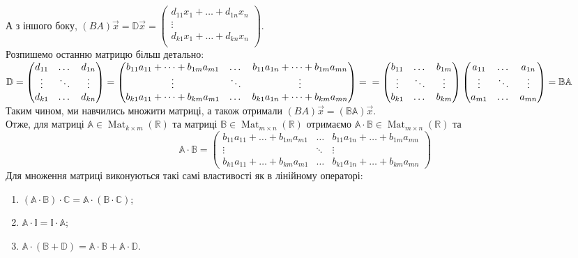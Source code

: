 \documentclass[a4paper, 10pt]{article}
\theoremstyle{theoremdd}
\DeclareMathOperator{\Mat}{Mat}
\begin{document}
	А з іншого боку, $(BA)\vec{x} = \mathbb{D}\vec{x} =
	\begin{pmatrix}
	d_{11} x_1 + \dots + d_{1n} x_n \\
	\vdots \\
	d_{k1} x_1 + \dots + d_{kn} x_n \\
	\end{pmatrix}$.\\
	Розпишемо останню матрицю більш детально:\\
	$\mathbb{D} = \begin{pmatrix}
	d_{11} & \dots & d_{1n}\\
	\vdots & \ddots & \vdots \\
	d_{k1} & \dots & d_{kn}
	\end{pmatrix} =
	\begin{pmatrix}
	b_{11}a_{11}+\dots+b_{1m}a_{m1} & \dots & b_{11}a_{1n}+\dots+b_{1m}a_{mn} \\
	\vdots & \ddots & \vdots \\
	b_{k1}a_{11} + \dots + b_{km}a_{m1} & \dots & b_{k1}a_{1n} + \dots + b_{km}a_{mn} 
	\end{pmatrix} = \\ =
	\begin{pmatrix}
	b_{11} & \dots & b_{1m}\\
	\vdots & \ddots & \vdots \\
	b_{k1} & \dots & b_{km}
	\end{pmatrix}
	\begin{pmatrix}
	a_{11} & \dots & a_{1n}\\
	\vdots & \ddots & \vdots \\
	a_{m1} & \dots & a_{mn}
	\end{pmatrix} = \mathbb{B} \mathbb{A}
	$\\
	Таким чином, ми навчились множити матриці, а також отримали $(BA)\vec{x} = (\mathbb{B} \mathbb{A})\vec{x}$.\\
	Отже, для матриці $\mathbb{A} \in \Mat_{k \times m}(\mathbb{R})$ та матриці $\mathbb{B} \in \Mat_{m \times n}(\mathbb{R})$ отримаємо $\mathbb{A} \cdot \mathbb{B} \in \Mat_{m \times n}(\mathbb{R})$ та
	$$ \mathbb{A} \cdot \mathbb{B} = \begin{pmatrix}
	b_{11}a_{11}+\dots+b_{1m}a_{m1} & \dots & b_{11}a_{1n}+\dots+b_{1m}a_{mn} \\
	\vdots & \ddots & \vdots \\
	b_{k1}a_{11} + \dots + b_{km}a_{m1} & \dots & b_{k1}a_{1n} + \dots + b_{km}a_{mn} 
	\end{pmatrix}$$
	Для множення матриці виконуються такі самі властивості як в лінійному операторі:
	\begin{enumerate}[nosep, label={\arabic*}, wide=0pt]
	\item $(\mathbb{A} \cdot \mathbb{B}) \cdot \mathbb{C} = \mathbb{A} \cdot (\mathbb{B} \cdot \mathbb{C})$;
	\item $\mathbb{A} \cdot \mathbb{I} = \mathbb{I} \cdot \mathbb{A}$;
	\item $\mathbb{A} \cdot (\mathbb{B} + \mathbb{D}) = \mathbb{A} \cdot \mathbb{B} + \mathbb{A} \cdot \mathbb{D}$.
	\end{enumerate}
	
\end{document}
